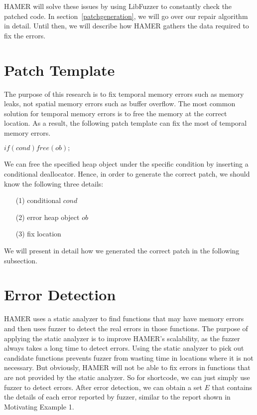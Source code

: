 \documentclass[a4paper,11pt,oneside,openany]{book}
\begin{document}
HAMER will solve these issues by using LibFuzzer to constantly check the patched code. In section~\ref{patchgeneration}, we will go over our repair algorithm in detail. Until then, we will describe how HAMER gathers the data required to fix the errors.

\section{Patch Template}
The purpose of this research is to fix temporal memory errors such as memory leaks, not spatial memory errors such as buffer overflow. The most common solution for temporal memory errors is to free the memory at the correct location. As a result, the following patch template can fix the most of temporal memory errors.


\begin{minipage}{\textwidth}
    \vspace{0.2cm}
    \textsl{\hspace{0.3cm}$if ( cond ) free ( ob );$\\}
\end{minipage}
We can free the specified heap object under the specific condition by inserting a conditional deallocator. Hence, in order to generate the correct patch, we should know the following three details:
\begin{itemize}
  \item[(1)] conditional $cond$
  \item[(2)] error heap object $ob$
  \item[(3)] fix location
\end{itemize}
We will present in detail how we generated the correct patch in the following subsection.

\section{Error Detection}
HAMER uses a static analyzer to find functions that may have memory errors and then uses fuzzer to detect the real errors in those functions. The purpose of applying the static analyzer is to improve HAMER's scalability, as the fuzzer always takes a long time to detect errors. Using the static analyzer to pick out candidate functions prevents fuzzer from wasting time in locations where it is not necessary. But obviously, HAMER will not be able to fix errors in functions that are not provided by the static analyzer. So for shortcode, we can just simply use fuzzer to detect errors. After error detection, we can obtain a set $E$ that contains the details of each error reported by fuzzer, similar to the report shown in Motivating Example 1.
\end{document}
